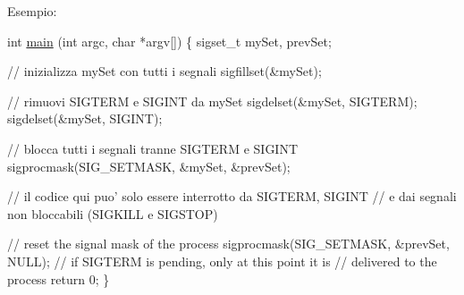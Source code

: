 Esempio\+: 
\begin{DoxyCode}
\textcolor{keywordtype}{int} \hyperlink{client_8c_a0ddf1224851353fc92bfbff6f499fa97}{main} (\textcolor{keywordtype}{int} argc, \textcolor{keywordtype}{char} *argv[]) \{
    sigset\_t mySet, prevSet;

    \textcolor{comment}{// inizializza mySet con tutti i segnali}
    sigfillset(&mySet);

    \textcolor{comment}{// rimuovi SIGTERM e SIGINT da mySet}
    sigdelset(&mySet, SIGTERM);
    sigdelset(&mySet, SIGINT);

    \textcolor{comment}{// blocca tutti i segnali tranne SIGTERM e SIGINT}
    sigprocmask(SIG\_SETMASK, &mySet, &prevSet);

    \textcolor{comment}{// il codice qui puo' solo essere interrotto da SIGTERM, SIGINT}
    \textcolor{comment}{// e dai segnali non bloccabili (SIGKILL e SIGSTOP)}

    \textcolor{comment}{// reset the signal mask of the process}
    sigprocmask(SIG\_SETMASK, &prevSet, NULL);
    \textcolor{comment}{// if SIGTERM is pending, only at this point it is}
    \textcolor{comment}{// delivered to the process}
    \textcolor{keywordflow}{return} 0;
\}
\end{DoxyCode}
 